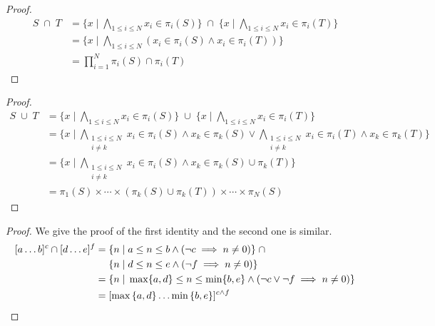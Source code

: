 \newcommand{\off}{S}
\newcommand{\offP}{T}

\vectorIntersect*

\begin{proof}
  \begin{align*}
    \off \; \cap \; \offP &
    = \{x \mid \bigwedge_{1 \leq i \leq N } x_i \in \pi_i(\off) \}
      \;\cap\;
      \{x \mid \bigwedge_{1 \leq i \leq N } x_i \in \pi_i(\offP) \} \\
    & = \{x \mid \bigwedge_{1 \leq i \leq N }
      (x_i \in \pi_i(\off) \wedge x_i \in \pi_i(\offP)) \} \\
    & = \prod_{i = 1}^{N} \pi_i(\off) \cap \pi_i(\offP)
  \end{align*}
\end{proof}

\vectorUnion*

\begin{proof}
  \begin{align*}
    \off \; \cup \; \offP &
    = \{x \mid
      \bigwedge_{1 \leq i \leq N } x_i \in \pi_i(\off) \}
      \;\cup\;
      \{x \mid
          \bigwedge_{1 \leq i \leq N } x_i \in \pi_i(\offP) \} \\
    & = \{x \mid
          \bigwedge_{\substack{1 \leq i \leq N \\ i \neq k}}
            x_i \in \pi_i(\off) \wedge x_k \in \pi_k(\off) \vee
          \bigwedge_{\substack{1 \leq i \leq N \\ i \neq k}} x_i \in
            \pi_i(\offP) \wedge x_k \in \pi_k(\offP)
        \} \\
    & = \{x \mid
          \bigwedge_{\substack{1 \leq i \leq N \\ i \neq k}} x_i \in
            \pi_i(\off) \wedge
            x_k \in \pi_k(\off) \cup \pi_k(\offP)
        \} \\
        & = \pi_1(\off) \times \cdots \times
        (\pi_k(\off) \cup \pi_k(\offP)) \times \cdots \times
        \pi_N(\off)
  \end{align*}
\end{proof}

\intervalIdentities*

\begin{proof}
  We give the proof of the first identity and the second one is similar.
  \begin{align*}
    \textnormal{$\lbrack a\dots b\rbrack^{c}$} \cap \textnormal{$\lbrack d\dots e\rbrack^{f}$} = &
      \; \{ n \;|\; a \leq n \leq b \wedge (\neg c \implies n \neq 0) \}
      \;\cap \\
      & \; \{ n \;|\; d \leq n \leq e \wedge (\neg f \implies n \neq 0) \}
      \\
    = & \; \{ n \;|\; \max \{a,d\} \leq n \leq \min \{b,e\} \wedge (\neg c
      \vee \neg f \implies n \neq 0) \} \\
    = & \; \textnormal{$\lbrack\max{\{a,d\}}\dots\min{\{b,e\}}\rbrack^{c \wedge f}$}
  \end{align*}
\end{proof}

